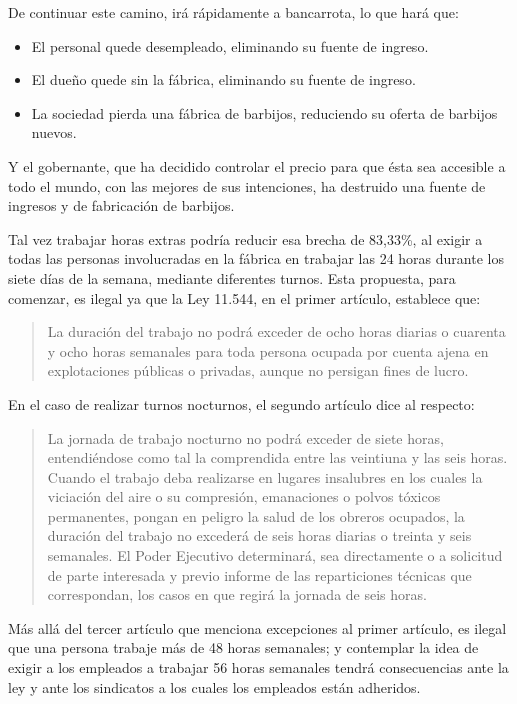\documentclass[12pt,a4paper,twoside]{book}
\begin{document}
De continuar este camino, irá rápidamente a bancarrota, lo que hará que:

\begin{itemize}
\item El personal quede desempleado, eliminando su fuente de ingreso.
\item El dueño quede sin la fábrica, eliminando su fuente de ingreso.
\item La sociedad pierda una fábrica de barbijos, reduciendo su oferta de barbijos nuevos.
\end{itemize}

Y el gobernante, que ha decidido controlar el precio para que ésta sea accesible a todo el mundo, con las mejores de sus intenciones, ha destruido una fuente de ingresos y de fabricación de barbijos.

Tal vez trabajar horas extras podría reducir esa brecha de 83,33\%, al exigir a todas las personas involucradas en la fábrica en trabajar las 24 horas durante los siete días de la semana, mediante diferentes turnos. Esta propuesta, para comenzar, es ilegal ya que la Ley 11.544, en el primer artículo, establece que: 

\begin{quotation}
La duración del trabajo no podrá exceder de ocho horas diarias o cuarenta y ocho horas semanales para toda persona ocupada por cuenta ajena en explotaciones públicas o privadas, aunque no persigan fines de lucro. \cite{ley:trabajo}
\end{quotation}

En el caso de realizar turnos nocturnos, el segundo artículo dice al respecto:

\begin{quotation}
La jornada de trabajo nocturno no podrá exceder de siete horas, entendiéndose como tal la comprendida entre las veintiuna y las seis horas. Cuando el trabajo deba realizarse en lugares insalubres en los cuales la viciación del aire o su compresión, emanaciones o polvos tóxicos permanentes, pongan en peligro la salud de los obreros ocupados, la duración del trabajo no excederá de seis horas diarias o treinta y seis semanales. El Poder Ejecutivo determinará, sea directamente o a solicitud de parte interesada y previo informe de las reparticiones técnicas que correspondan, los casos en que regirá la jornada de seis horas. \cite{ley:trabajo}
\end{quotation}

Más allá del tercer artículo que menciona excepciones al primer artículo, es ilegal que una persona trabaje más de 48 horas semanales; y contemplar la idea de exigir a los empleados a trabajar 56 horas semanales tendrá consecuencias ante la ley y ante los sindicatos a los cuales los empleados están adheridos.
\end{document}
